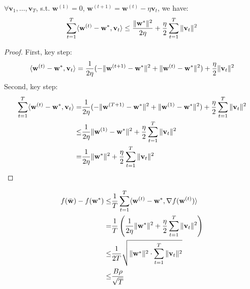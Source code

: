 \begin{lem}
	$ \forall \mathbf{v}_1, \dots, \mathbf{v}_T $, s.t. $ \mathbf{w}^{(1)} = 0 $, 
	$ \mathbf{w}^{(t+1)} = \mathbf{w}^{(t)}-\eta \mathbf{v}_t $, we have:
	\begin{equation}
		\sum\limits^T_{t=1} \langle \mathbf{w}^{(t)} - \mathbf{w}^*, \mathbf{v}_t \rangle
		\le \frac{\Arrowvert \mathbf{w}^* \Arrowvert^2}{2\eta} + \frac{\eta}{2}
		\sum\limits^T_{t=1} \Arrowvert \mathbf{v}_t \Arrowvert^2
	\end{equation}
	\begin{proof}
		First, key step:
		\[ 
			\langle \mathbf{w}^{(t)} - \mathbf{w}^*, \mathbf{v}_t \rangle
			= \frac{1}{2\eta}(-\Arrowvert \mathbf{w}^{(t+1)} - \mathbf{w}^* \Arrowvert^2 + 
			\Arrowvert \mathbf{w}^{(t)} - \mathbf{w}^* \Arrowvert^2) + \frac{\eta}{2}
			\Arrowvert \mathbf{v}_t \Arrowvert^2
		\]
		Second, key step:
		\begin{align*}
			\sum\limits^T_{t=1} \langle \mathbf{w}^{(t)} - \mathbf{w}^*, \mathbf{v}_t \rangle
			=& \frac{1}{2\eta}(-\Arrowvert \mathbf{w}^{(T+1)} - \mathbf{w}^* \Arrowvert^2 + 
			\Arrowvert \mathbf{w}^{(1)} - \mathbf{w}^* \Arrowvert^2) + \frac{\eta}{2}
			\sum\limits^T_{t=1} \Arrowvert \mathbf{v}_t \Arrowvert^2 \\
			\le& \frac{1}{2\eta} \Arrowvert \mathbf{w}^{(1)} - \mathbf{w}^* \Arrowvert^2 
			+\frac{\eta}{2}\sum\limits^T_{t=1} \Arrowvert \mathbf{v}_t \Arrowvert^2 \\
			=& \frac{1}{2\eta} \Arrowvert \mathbf{w}^* \Arrowvert^2 
			+\frac{\eta}{2}\sum\limits^T_{t=1} \Arrowvert \mathbf{v}_t \Arrowvert^2 \\
		\end{align*}
	\end{proof}
\end{lem}

\begin{align*}
	f(\bar{\mathbf{w}}) - f(\mathbf{w}^*)
	\le& \frac{1}{T} \sum\limits^T_{t=1} \langle \mathbf{w}^{(t)} - \mathbf{w}^*, \nabla f(\mathbf{w}^{(t)}) \rangle\\
	=& \frac{1}{T} \left( \frac{1}{2\eta} \Arrowvert \mathbf{w}^* \Arrowvert^2 
	+\frac{\eta}{2}\sum\limits^T_{t=1} \Arrowvert \mathbf{v}_t \Arrowvert^2 \right)\\
	\le& \frac{1}{2T} 
	\sqrt{\Arrowvert \mathbf{w}^* \Arrowvert^2 \cdot \sum\limits^T_{t=1} \Arrowvert \mathbf{v}_t \Arrowvert^2}\\
	\le& \frac{B \rho}{\sqrt T}
\end{align*}

